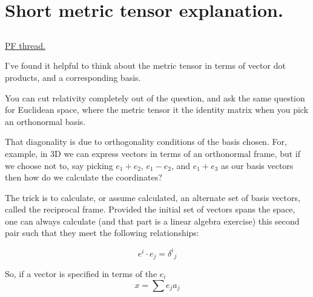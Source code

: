 
%


\chapter{Short metric tensor explanation.}
\label{chap:lorentzMetricTensor}
\date{August 30, 2008.  $RCSfile: lorentzMetricTensor.tex,v $ Last $Revision: 1.9 $ $Date: 2009/06/14 23:51:45 $ }

%


\section{}

\href{http://www.physicsforums.com/showthread.php?p=1853416}{PF thread.}

I've found it helpful to think about the metric tensor in terms of vector dot products, and a corresponding basis.  

You can cut relativity completely out of the question, and ask the same question for Euclidean space, where the metric tensor it the identity matrix when you pick an orthonormal basis.

That diagonality is due to orthogonality conditions of the basis chosen.  For, example, in 3D we can express vectors in terms of an
orthonormal frame, but if we choose not to, say picking $e_1 + e_2$, $e_1-e_2$, and $e_1 + e_3$ as our basis vectors then how do we calculate the coordinates?

The trick is to calculate, or assume calculated, an alternate set of basis vectors, called the reciprocal frame.  Provided the initial set of vectors spans the space, one can always calculate (and that part is a linear algebra exercise) this second pair such that they meet the following relationships:

\begin{equation*}
e^i \cdot e_j = {\delta^i}_j
\end{equation*}

So, if a vector is specified in terms of the $e_i$
\begin{equation*}
x = \sum e_j a_j
\end{equation*}

